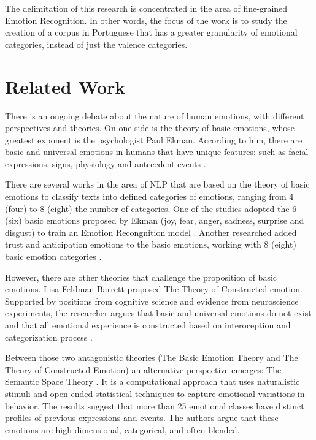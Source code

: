\documentclass[12pt]{article}
\begin{document}
The delimitation of this research is concentrated in the area of fine-grained Emotion Recognition. In other words, the focus of the work is to study the creation of a corpus in Portuguese that has a greater granularity of emotional categories, instead of just the valence categories.

\section{Related Work}
\label{sec:related-work}

There is an ongoing debate about the nature of human emotions, with different perspectives and theories. On one side is the theory of basic emotions, whose greatest exponent is the psychologist Paul Ekman. According to him, there are basic and universal emotions in humans that have unique features: such as facial expressions, signs, physiology and antecedent events \cite{Ekman1992}.

There are several works in the area of NLP that are based on the theory of basic emotions to classify texts into defined categories of emotions, ranging from 4 (four) to 8 (eight) the number of categories. One of the studies adopted the 6 (six) basic emotions proposed by Ekman (joy, fear, anger, sadness, surprise and disgust) to train an Emotion Recongnition model \cite{Batbaatar2019}. Another researched added trust and anticipation emotions to the basic emotions, working with 8 (eight) basic emotion categories \cite{Sosea2020}.

However, there are other theories that challenge the proposition of basic emotions. Lisa Feldman Barrett proposed The Theory of Constructed emotion. Supported by positions from cognitive science and evidence from neuroscience experiments, the researcher argues that basic and universal emotions do not exist and that all emotional experience is constructed based on interoception and categorization process \cite{Barrett2016}.

Between those two antagonistic theories (The Basic Emotion Theory and The Theory of Constructed Emotion) an alternative perspective emerges: The Semantic Space Theory \cite{Cowen2021}. It is a computational approach that uses naturalistic stimuli and open-ended statistical techniques to capture emotional variations in behavior. The results suggest that more than 25 emotional classes have distinct profiles of previous expressions and events. The authors argue that these emotions are high-dimensional, categorical, and often blended.
\end{document}
